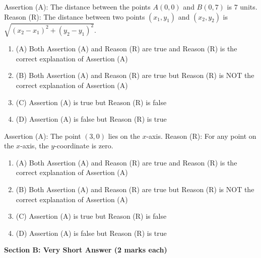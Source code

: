 \documentclass[12pt,a4paper]{exam}
\begin{document}
\begin{questions}
\question[1] Assertion (A): The distance between the points $A(0, 0)$ and $B(0, 7)$ is $7$ units. Reason (R): The distance between two points $(x_1, y_1)$ and $(x_2, y_2)$ is $\sqrt{(x_2-x_1)^2 + (y_2-y_1)^2}$.
\begin{enumerate}[label=(\Alph*)]
  \item (A) Both Assertion (A) and Reason (R) are true and Reason (R) is the correct explanation of Assertion (A)
  \item (B) Both Assertion (A) and Reason (R) are true but Reason (R) is NOT the correct explanation of Assertion (A)
  \item (C) Assertion (A) is true but Reason (R) is false
  \item (D) Assertion (A) is false but Reason (R) is true
\end{enumerate}
\vspace{0.15cm}

\question[1] Assertion (A): The point $(3, 0)$ lies on the $x$-axis. Reason (R): For any point on the $x$-axis, the $y$-coordinate is zero.
\begin{enumerate}[label=(\Alph*)]
  \item (A) Both Assertion (A) and Reason (R) are true and Reason (R) is the correct explanation of Assertion (A)
  \item (B) Both Assertion (A) and Reason (R) are true but Reason (R) is NOT the correct explanation of Assertion (A)
  \item (C) Assertion (A) is true but Reason (R) is false
  \item (D) Assertion (A) is false but Reason (R) is true
\end{enumerate}
\vspace{0.15cm}

\end{questions}
\bigskip
\noindent\textbf{\large Section B: Very Short Answer (2 marks each)}
\end{document}
